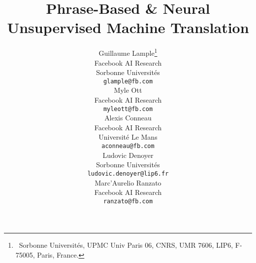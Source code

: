 \documentclass[11pt,a4paper]{article}
\title{Phrase-Based \& Neural Unsupervised Machine Translation}
\author{
Guillaume Lample\thanks{\ Sorbonne Universit\'es, UPMC Univ Paris 06, CNRS, UMR 7606, LIP6, F-75005, Paris, France.} \\
Facebook AI Research \\
Sorbonne Universités \\
\texttt{glample@fb.com} \\
\And
Myle Ott \\
Facebook AI Research \\
\texttt{myleott@fb.com} \\
\And
Alexis Conneau \\
Facebook AI Research \\
Universit\'e Le Mans \\
\texttt{aconneau@fb.com} \\
\AND
Ludovic Denoyer\\
Sorbonne Universités \\
\texttt{ludovic.denoyer@lip6.fr} \\
\And
Marc'Aurelio Ranzato \\
Facebook AI Research \\
\texttt{ranzato@fb.com} \\
}
\date{}
\begin{document}
\maketitle

\newcommand{\insertallresults}{
    \begin{table*}[h!]
    \small
    \begin{tabular}[b]{l|cc|cc|cc|cc}
    \toprule
    & en  fr  & fr en & en de & de en & en ro & ro en & en ru & ru en \\
    \midrule
    \multicolumn{9}{l}{\it Unsupervised PBSMT} \\
    \midrule
    Unsupervised phrase table  &   -   & 17.50 &   -   & 15.63 &   -   & 14.10 &   -   &  8.08 \\
    Back-translation - Iter. 1 & 24.79 & 26.16 & 15.92 & 22.43 & 18.21 & 21.49 & 11.04 & 15.16 \\
    Back-translation - Iter. 2 & 27.32 & 26.80 & 17.65 & 22.85 & 20.61 & 22.52 & 12.87 & 16.42 \\
    Back-translation - Iter. 3 & 27.77 & 26.93 & 17.94 & 22.87 & 21.18 & 22.99 & 13.13 & 16.52 \\
    Back-translation - Iter. 4 & 27.84 & 27.20 & 17.77 & 22.68 & 21.33 & 23.01 & 13.37 & \textbf{16.62} \\
    Back-translation - Iter. 5 & \textbf{28.11} & 27.16 &   -   &   -   &   -   &   -   &   -   &   -   \\
    \midrule
    \multicolumn{9}{l}{\it Unsupervised NMT} \\
    \midrule
    LSTM                & 24.48 & 23.74 & 14.71 & 19.60 &   -   &   -   &   -   &   -   \\
    Transformer         & 25.14 & 24.18 & 17.16 & 21.00 & 21.18 & 19.44 &  7.98 &  9.09 \\
    \midrule
    \multicolumn{9}{l}{\it Phrase-based + Neural network} \\
    \midrule
    NMT + PBSMT         & 27.12 & 26.29 & 17.52 & 22.06 & 21.95 & 23.73 & 10.14 & 12.62 \\
    PBSMT + NMT         & 27.60 & \textbf{27.68} & \textbf{20.23} & \textbf{25.19} & \textbf{25.13} & \textbf{23.90} & \textbf{13.76} & \textbf{16.62} \\
    \bottomrule
    \end{tabular}
    \caption{\small \textbf{Fully unsupervised results.} We report the BLEU score for PBSMT, NMT, and their combinations on 8 directed language pairs. Results are obtained on \textit{newstest} 2014 for  and \textit{newstest} 2016 for every other pair.
    }
    \label{tab:allresults}
    \vspace{-0.25cm}
    \end{table*}
}
\end{document}
